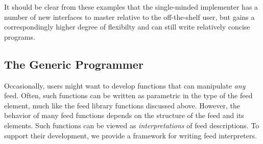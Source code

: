 It should be clear from these examples that the single-minded implementer
has a number of new interfaces to master relative to the off-the-shelf
user, but gains a correspondingly higher degree of flexibilty and can
still write relatively concise programs.


\subsection{The Generic Programmer}


Occasionally, users might want to develop functions that can
manipulate {\it any} feed. 
Often, such functions can be written as
parametric in the type of the feed element, much like the feed
library functions discussed above. However, the behavior of many feed
functions depends on the structure of the feed and its
elements. Such functions can be viewed as {\it interpretations} of
feed descriptions. To support their development, we provide a
framework for writing feed interpreters.


